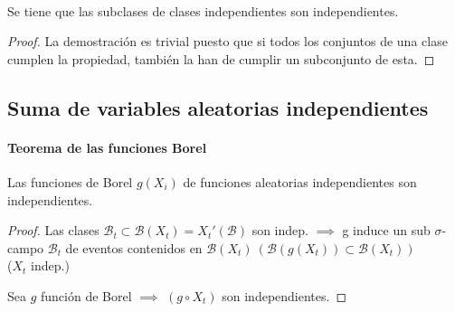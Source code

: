 \begin{theorem}
  \
  
Se tiene que las subclases de clases independientes son independientes.
\end{theorem}

\begin{proof}
	La demostración es trivial puesto que si todos los conjuntos de una clase cumplen la propiedad, también la han de cumplir un subconjunto de esta.
\end{proof}

\subsection{Suma de variables aleatorias independientes}
\paragraph{Teorema de las funciones Borel}
\begin{theorem}
Las funciones de Borel $g(X_i)$ de funciones aleatorias independientes son independientes.
\end{theorem}


\begin{proof}
Las clases $\mathcal{B}_t\subset \mathcal{B}(X_t) = X_t'(\mathcal{B})$ son indep. $\implies$ g induce un sub $\sigma$-campo $\mathcal{B}_t$ de eventos contenidos en $\mathcal{B}(X_t) \ (\mathcal{B}(g(X_t)) \subset \mathcal{B}(X_t))$
\\


($X_t$ indep.)

Sea $g$ función de Borel $\implies$ $(g \circ X_t)$ son independientes.

\end{proof}


